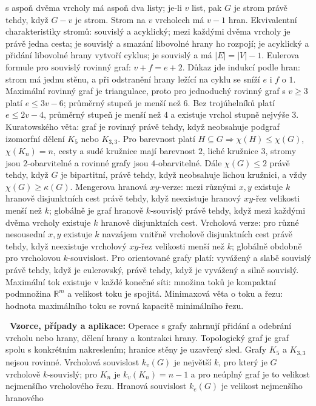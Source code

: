 \begin{odpoved}
s aspoň dvěma vrcholy má aspoň dva listy; je-li $v$ list, pak $G$ je strom právě tehdy,
když $G-v$ je strom. Strom na $v$ vrcholech má $v-1$ hran. Ekvivalentní charakteristiky
stromů: souvislý a acyklický; mezi každými dvěma vrcholy je právě jedna cesta; je souvislý
a smazání libovolné hrany ho rozpojí; je acyklický a přidání libovolné hrany vytvoří
cyklus; je souvislý a má $|E|=|V|-1$. Eulerova formule pro souvislý rovinný graf:
$v+f=e+2$. Důkaz jde indukcí podle hran: strom má jednu stěnu, a při odstranění hrany
ležící na cyklu se sníží $e$ i $f$ o $1$. Maximální rovinný graf je triangulace, proto
pro jednoduchý rovinný graf s $v\ge3$ platí $e\le3v-6$; průměrný stupeň je menší než
$6$. Bez trojúhelníků platí $e\le2v-4$, průměrný stupeň je menší než $4$ a existuje
vrchol stupně nejvýše $3$. Kuratowského věta: graf je rovinný právě tehdy, když neobsahuje
podgraf izomorfní dělení $K_5$ nebo $K_{3,3}$. Pro barevnost platí
$H\subseteq G\Rightarrow\chi(H)\le\chi(G)$, $\chi(K_n)=n$, cesty a sudé kružnice mají
barevnost $2$, liché kružnice $3$, stromy jsou $2$-obarvitelné a rovinné grafy jsou
$4$-obarvitelné. Dále $\chi(G)\le2$ právě tehdy, když $G$ je bipartitní, právě tehdy,
když neobsahuje lichou kružnici, a vždy $\chi(G)\ge\kappa(G)$. Mengerova hranová
$xy$-verze: mezi různými $x,y$ existuje $k$ hranově disjunktních cest právě tehdy,
když neexistuje hranový $xy$-řez velikosti menší než $k$; globálně je graf hranově
$k$-souvislý právě tehdy, když mezi každými dvěma vrcholy existuje $k$ hranově disjunktních
cest. Vrcholová verze: pro různé nesousední $x,y$ existuje $k$ navzájem vnitřně vrcholově
disjunktních cest právě tehdy, když neexistuje vrcholový $xy$-řez velikosti menší než
$k$; globálně obdobně pro vrcholovou $k$-souvislost. Pro orientované grafy platí:
vyvážený a slabě souvislý právě tehdy, když je eulerovský, právě tehdy, když je vyvážený
a silně souvislý. Maximální tok existuje v každé konečné síti: množina toků je kompaktní
podmnožina $\mathbb R^m$ a velikost toku je spojitá. Minimaxová věta o toku a řezu:
hodnota maximálního toku se rovná kapacitě minimálního řezu.\par
\noindent{}\ \textbf{Vzorce, případy a aplikace:} Operace s grafy zahrnují přidání
a odebrání vrcholu nebo hrany, dělení hrany a kontrakci hrany. Topologický graf je graf
spolu s konkrétním nakreslením; hranice stěny je uzavřený sled. Grafy $K_5$ a
$K_{3,3}$ nejsou rovinné. Vrcholová souvislost $k_v(G)$ je největší $k$, pro který je
$G$ vrcholově $k$-souvislý; pro $K_n$ je $k_v(K_n)=n-1$ a pro neúplný graf je to velikost
nejmenšího vrcholového řezu. Hranová souvislost $k_e(G)$ je velikost nejmenšího hranového

\end{odpoved}
